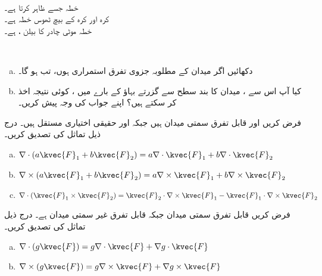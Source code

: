 \quad {}\\
خطہ  جسے  ظاہر کرتا ہے۔
\quad {}\\
کرہ  اور کرہ  کے بیچ ٹھوس  خطہ  ہے۔
\quad {}\\
خطہ  موٹی چادر کا بیلن ،  ہے۔

\\
\begin{enumerate}[a.]
\item
دکھائیں اگر  میدان  کے مطلوبہ جزوی تفرق استمراری  ہوں، تب  ہو گا۔
\item
کیا آپ اس سے  ، میدان  کا بند سطح سے گزرتے بہاؤ کے بارے میں ،  کوئی   نتیجہ اخذ  کر  سکتے ہیں؟ اپنے جواب کی وجہ پیش کریں۔
\end{enumerate}
فرض کریں  اور   قابل تفرق سمتی میدان ہیں جبکہ  اور   حقیقی اختیاری مستقل ہیں۔ درج ذیل تماثل کی تصدیق کریں۔
\begin{enumerate}[a.]
\item
\(\nabla\cdot(a\kvec{F}_1+b\kvec{F}_2)=a\nabla\cdot\kvec{F}_1+b\nabla\cdot\kvec{F}_2\)
\item
\(\nabla\times(a\kvec{F}_1+b\kvec{F}_2)=a\nabla\times\kvec{F}_1+b\nabla\times\kvec{F}_2\)
\item
\(\nabla\cdot(\kvec{F}_1\times\kvec{F}_2)=\kvec{F}_2\cdot\nabla\times\kvec{F}_1-\kvec{F}_1\cdot\nabla\times\kvec{F}_2\)
\end{enumerate}
فرض کریں  قابل تفرق سمتی میدان  جبکہ   قابل تفرق غیر سمتی میدان ہے۔ درج ذیل تماثل کی تصدیق کریں۔
\begin{enumerate}[a.]
\item
\(\nabla\cdot(g\kvec{F})=g\nabla\cdot\kvec{F}+\nabla g\cdot \kvec{F}\)
\item
\(\nabla\times(g\kvec{F})=g\nabla\times\kvec{F}+\nabla g\times\kvec{F}\)
\end{enumerate}

